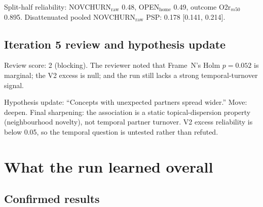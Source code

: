 \documentclass[11pt,letterpaper]{article}
\begin{document}
Split-half reliability: NOVCHURN$_{\text{raw}}$ 0.48, OPEN$_{\text{home}}$ 0.49, outcome O2r$_{m50}$ 0.895. Disattenuated pooled NOVCHURN$_{\text{raw}}$ PSP: 0.178 [0.141, 0.214].

\subsection{Iteration 5 review and hypothesis update}

Review score: 2 (blocking). The reviewer noted that Frame~N's Holm $p = 0.052$ is marginal; the V2 excess is null; and the run still lacks a strong temporal-turnover signal.

Hypothesis update: ``Concepts with unexpected partners spread wider.'' Move: deepen. Final sharpening: the association is a static topical-dispersion property (neighbourhood novelty), not temporal partner turnover. V2 excess reliability is below 0.05, so the temporal question is untested rather than refuted.

\section{What the run learned overall}
\label{sec:overall}

\subsection{Confirmed results}
\end{document}
